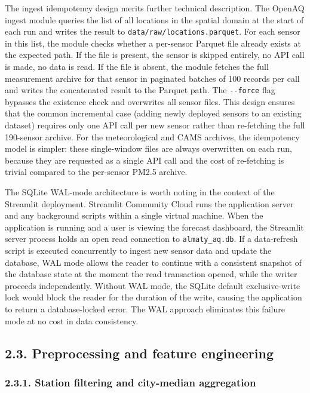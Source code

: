The ingest idempotency design merits further technical description. The OpenAQ ingest module queries the list of all locations in the spatial domain at the start of each run and writes the result to \texttt{data/raw/locations.parquet}. For each sensor in this list, the module checks whether a per-sensor Parquet file already exists at the expected path. If the file is present, the sensor is skipped entirely, no API call is made, no data is read. If the file is absent, the module fetches the full measurement archive for that sensor in paginated batches of 100 records per call and writes the concatenated result to the Parquet path. The \texttt{-\/-force} flag bypasses the existence check and overwrites all sensor files. This design ensures that the common incremental case (adding newly deployed sensors to an existing dataset) requires only one API call per new sensor rather than re-fetching the full 190-sensor archive. For the meteorological and CAMS archives, the idempotency model is simpler: these single-window files are always overwritten on each run, because they are requested as a single API call and the cost of re-fetching is trivial compared to the per-sensor PM2.5 archive.

The SQLite WAL-mode architecture is worth noting in the context of the Streamlit deployment. Streamlit Community Cloud runs the application server and any background scripts within a single virtual machine. When the application is running and a user is viewing the forecast dashboard, the Streamlit server process holds an open read connection to \texttt{almaty\_aq.db}. If a data-refresh script is executed concurrently to ingest new sensor data and update the database, WAL mode allows the reader to continue with a consistent snapshot of the database state at the moment the read transaction opened, while the writer proceeds independently. Without WAL mode, the SQLite default exclusive-write lock would block the reader for the duration of the write, causing the application to return a database-locked error. The WAL approach eliminates this failure mode at no cost in data consistency.

\subsection{2.3. Preprocessing and feature engineering}\label{preprocessing-and-feature-engineering}

\subsubsection{2.3.1. Station filtering and city-median aggregation}\label{station-filtering-and-city-median-aggregation}


